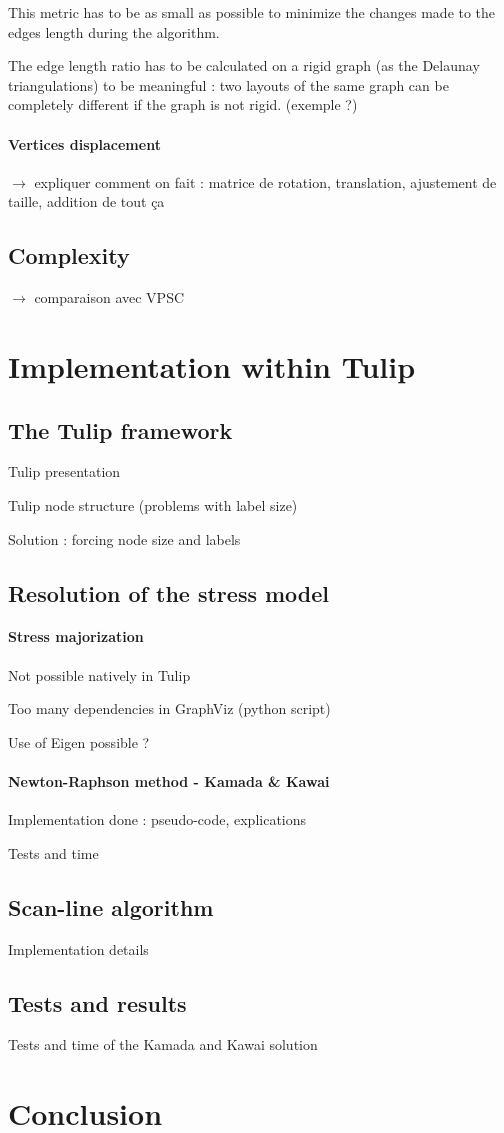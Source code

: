 \documentclass[12pt]{report}
\begin{document}
This metric has to be as small as possible to minimize the changes made to the edges length during the algorithm.

The edge length ratio has to be calculated on a rigid graph (as the Delaunay triangulations) to be meaningful : two layouts of the same graph can be completely different if the graph is not rigid. (exemple ?)

\subsubsection{Vertices displacement}


$\rightarrow$ expliquer comment on fait : matrice de rotation, translation, ajustement de taille, addition de tout ça

\section{Complexity}


$\rightarrow$ comparaison avec VPSC
\chapter{Implementation within Tulip}

\section{The Tulip framework}

Tulip presentation \cite{Auber12}

Tulip node structure (problems with label size)

Solution : forcing node size and labels

\section{Resolution of the stress model}
\subsubsection{Stress majorization}
Not possible natively in Tulip

Too many dependencies in GraphViz (python script)

Use of Eigen possible ?
\subsubsection{Newton-Raphson method - Kamada \& Kawai}
Implementation done : pseudo-code, explications

Tests and time
\section{Scan-line algorithm}
Implementation details

\section{Tests and results}
Tests and time of the Kamada and Kawai solution

\chapter{Conclusion}



\end{document}
